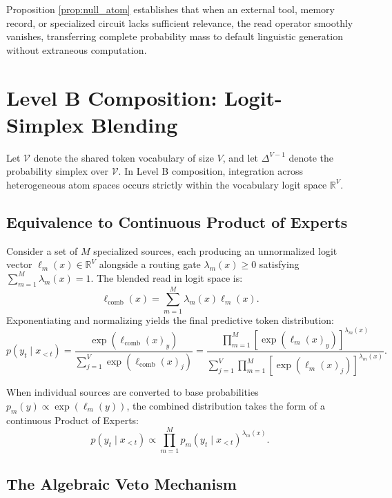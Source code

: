 \documentclass[preprint,12pt]{elsarticle}
\begin{document}
Proposition \ref{prop:null_atom} establishes that when an external tool, memory record, or specialized circuit lacks sufficient relevance, the read operator smoothly vanishes, transferring complete probability mass to default linguistic generation without extraneous computation.

\section{Level B Composition: Logit-Simplex Blending}

Let $\mathcal{V}$ denote the shared token vocabulary of size $V$, and let $\Delta^{V-1}$ denote the probability simplex over $\mathcal{V}$. In Level B composition, integration across heterogeneous atom spaces occurs strictly within the vocabulary logit space $\mathbb{R}^V$.

\subsection{Equivalence to Continuous Product of Experts}

Consider a set of $M$ specialized sources, each producing an unnormalized logit vector $\ell_m(x) \in \mathbb{R}^V$ alongside a routing gate $\lambda_m(x) \ge 0$ satisfying $\sum_{m=1}^M \lambda_m(x) = 1$. The blended read in logit space is:
\begin{equation}
\ell_{\mathrm{comb}}(x) = \sum_{m=1}^M \lambda_m(x) \ell_m(x).
\end{equation}
Exponentiating and normalizing yields the final predictive token distribution:
\begin{equation}
p(y_t \mid x_{<t}) = \frac{\exp(\ell_{\mathrm{comb}}(x)_y)}{\sum_{j=1}^V \exp(\ell_{\mathrm{comb}}(x)_j)} = \frac{\prod_{m=1}^M \left[ \exp(\ell_m(x)_y) \right]^{\lambda_m(x)}}{\sum_{j=1}^V \prod_{m=1}^M \left[ \exp(\ell_m(x)_j) \right]^{\lambda_m(x)}}.
\end{equation}

When individual sources are converted to base probabilities $p_m(y) \propto \exp(\ell_m(y))$, the combined distribution takes the form of a continuous Product of Experts:
\begin{equation}
p(y_t \mid x_{<t}) \propto \prod_{m=1}^M p_m(y_t \mid x_{<t})^{\lambda_m(x)}.
\label{eq:poe}
\end{equation}

\subsection{The Algebraic Veto Mechanism}
\end{document}
